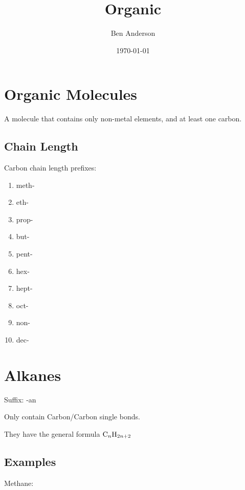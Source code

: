 \documentclass[a4paper,11pt]{article}
\begin{document}
\title{Organic}
\author{Ben Anderson}
\date{\today}
\maketitle
\pagebreak

\tableofcontents
\pagebreak


\section{Organic Molecules}

A molecule that contains only non-metal elements, and at least one carbon.

\subsection{Chain Length}

Carbon chain length prefixes:

\begin{enumerate}
\item meth-
\item eth-
\item prop-
\item but-
\item pent-
\item hex-
\item hept-
\item oct-
\item non-
\item dec-
\end{enumerate}




\section{Alkanes}

Suffix: -an

Only contain Carbon/Carbon single bonds.

They have the general formula $\ce{C_{n}H_{2n + 2}}$


\subsection{Examples}

Methane:

\begin{center}
\end{center}
\end{document}
